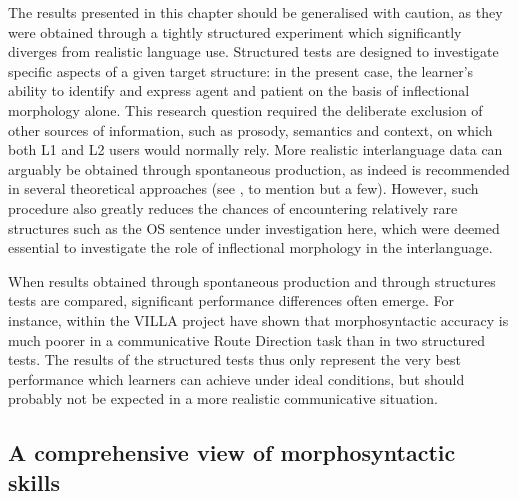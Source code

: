 The results presented in this chapter should be generalised with caution, as they were obtained through a tightly structured experiment which significantly diverges from realistic language use. Structured tests are designed to investigate specific aspects of a given target structure: in the present case, the learner’s ability to identify and express agent and patient on the basis of inflectional morphology alone. This research question required the deliberate exclusion of other sources of information, such as prosody, semantics and context, on which both L1 and L2 users would normally rely. More realistic interlanguage data can arguably be obtained through spontaneous production, as indeed is recommended in several theoretical approaches (see \citealt{Krashen1985, Perdue1993, Pienemann1998}, to mention but a few). However, such procedure also greatly reduces the chances of encountering relatively rare structures such as the OS sentence under investigation here, which were deemed essential to investigate the role of inflectional morphology in the interlanguage.

When results obtained through spontaneous production and through structures tests are compared, significant performance differences often emerge. For instance, within the VILLA project \citet{WatorekEtAl2016} have shown that morphosyntactic accuracy is much poorer in a communicative Route Direction task than in two structured tests. The results of the structured tests thus only represent the very best performance which learners can achieve under ideal conditions, but should probably not be expected in a more realistic communicative situation.

\subsection{A comprehensive view of morphosyntactic skills}\label{sec:08:6.3}

